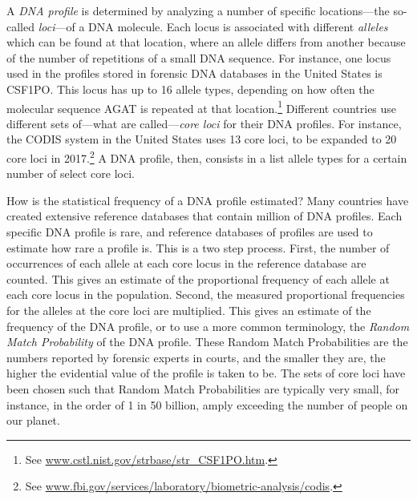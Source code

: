 \documentclass[10pt]{article}
\begin{document}
A \textit{DNA profile} is determined by analyzing a number of specific locations---the so-called \textit{loci}---of a DNA molecule. %
Each locus is associated with different \textit{alleles} 
which can be found at that location, where an allele differs from another because 
of the number of repetitions of a small DNA sequence. For instance, one locus used in the profiles stored in forensic DNA databases in the United States is CSF1PO. 
This locus has up to 16 allele types, depending on how often the molecular sequence AGAT is repeated at that location.\footnote{See \url{www.cstl.nist.gov/strbase/str\_CSF1PO.htm}.} 
Different countries use different sets of---what are called---\textit{core loci} for their DNA profiles. 
For instance, the CODIS system in the United States uses 13 core loci, to be expanded to 20 core loci in 2017.\footnote{See \url{www.fbi.gov/services/laboratory/biometric-analysis/codis}.} 
A DNA profile, then, consists in a list allele types for a certain number of select core loci. 


How is the statistical frequency of a DNA profile estimated?
Many countries have created extensive reference databases that contain million of DNA profiles. 
Each specific DNA profile is rare, and reference databases of profiles 
are used to estimate 
how rare a profile 
is.
This is a two step process. First, the number of occurrences of each allele at each core locus in the reference database are counted.
This gives an estimate of the proportional frequency of each allele at each core locus in the population. Second, the measured proportional frequencies for the alleles at the core loci are 
multiplied. This gives an estimate of the frequency of the DNA profile, or to use a more common terminology, 
the \textit{Random Match Probability} of the DNA profile. %
These Random Match Probabilities are the numbers reported by forensic experts in courts, and the smaller they are, the higher the evidential value of the profile is taken to be. The sets of core loci have been chosen such that Random Match Probabilities are typically very small, for instance, in the order of 1 in 50 billion, amply exceeding the number of people on our planet. 
\end{document}
